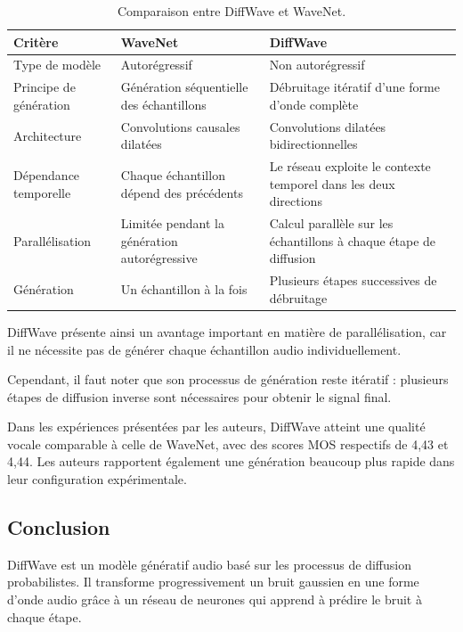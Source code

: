 \begin{table}[htbp]
    \centering
    \caption{Comparaison entre DiffWave et WaveNet.}
    \label{tab:diffwave_wavenet}
    \begin{tabular}{|p{3cm}|p{5cm}|p{5cm}|}
        \hline
        \textbf{Critère} &
        \textbf{WaveNet} &
        \textbf{DiffWave} \\
        \hline
        Type de modèle &
        Autorégressif &
        Non autorégressif \\
        \hline
        Principe de génération &
        Génération séquentielle des échantillons &
        Débruitage itératif d'une forme d'onde complète \\
        \hline
        Architecture &
        Convolutions causales dilatées &
        Convolutions dilatées bidirectionnelles \\
        \hline
        Dépendance temporelle &
        Chaque échantillon dépend des précédents &
        Le réseau exploite le contexte temporel dans
        les deux directions \\
        \hline
        Parallélisation &
        Limitée pendant la génération autorégressive &
        Calcul parallèle sur les échantillons à chaque
        étape de diffusion \\
        \hline
        Génération &
        Un échantillon à la fois &
        Plusieurs étapes successives de débruitage \\
        \hline
    \end{tabular}
\end{table}

DiffWave présente ainsi un avantage important en matière de
parallélisation, car il ne nécessite pas de générer chaque
échantillon audio individuellement.

Cependant, il faut noter que son processus de génération
reste itératif : plusieurs étapes de diffusion inverse sont
nécessaires pour obtenir le signal final.

Dans les expériences présentées par les auteurs, DiffWave
atteint une qualité vocale comparable à celle de WaveNet,
avec des scores MOS respectifs de 4,43 et 4,44. Les auteurs
rapportent également une génération beaucoup plus rapide
dans leur configuration expérimentale.

\subsection{Conclusion}

DiffWave est un modèle génératif audio basé sur les processus
de diffusion probabilistes. Il transforme progressivement
un bruit gaussien en une forme d'onde audio grâce à un réseau
de neurones qui apprend à prédire le bruit à chaque étape.

